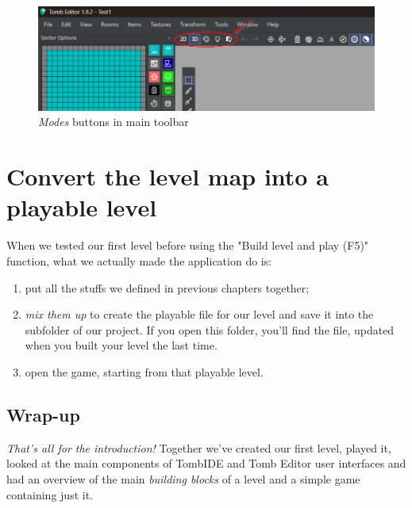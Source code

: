 \begin{figure}
    \centering
     \includegraphics[width=1\textwidth]{screenshots/1008.png}
     \caption{\emph{Modes} buttons in main toolbar}
     \label{fig:TEModesInToolbar} 
\end{figure}

\chapter{Convert the level map into a playable level}
When we tested our first level before using the "Build level and play (F5)" function, what we actually made the application do is:
\begin{enumerate}
    \item put all the stuffs we defined in previous chapters together;
    \item \emph{mix them up} to create the playable file for our level and save it into the  subfolder of our project. If you open this folder, you'll find the  file, updated when you built your level the last time.
    \item open the game, starting from that playable level.
\end{enumerate}

\section{Wrap-up}
\emph{That's all for the introduction!} Together we've created our first level, played it, looked at the main components of TombIDE and Tomb Editor user interfaces and had an overview of the main \emph{building blocks} of a level and a simple game containing just it.